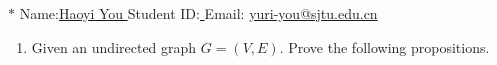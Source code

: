 \documentclass[12pt,a4paper]{article}
\theoremstyle{definition}
\begin{document}
\noindent

\noindent{}
\begin{center}
\footnotesize{\color{blue}$*$ Name:\underline{\quad   Haoyi You  \quad  }\quad Student ID:\underline{ \quad} \quad Email: \underline{\quad yuri-you@sjtu.edu.cn \quad}}
\end{center}

\begin{enumerate}

	\item Given an undirected graph $G = (V, E)$. Prove the following propositions.
	

\end{enumerate}
\end{document}
